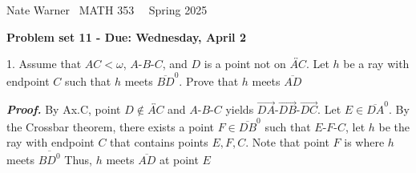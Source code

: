 \documentclass{report}
\title{\Huge{}}
\author{\huge{Nathan Warner}}
\date{\huge{}}
\begin{document}
    \pagebreak \bigbreak \noindent
    Nate Warner \ \quad \quad \quad \quad \quad \quad \quad \quad \quad \quad \quad \quad  MATH 353 \quad  \quad \quad \quad \quad \quad \quad \quad \quad \ \ \quad \quad Spring 2025
    \begin{center}
        \textbf{Problem set 11 - Due: Wednesday, April 2}
    \end{center}
    \bigbreak \noindent 
    \begin{mdframed}
        1. Assume that $AC < \omega$, $ A\text{-}B\text{-}C$, and $D$ is a point not on $\overleftrightarrow{AC}$. Let $h$ be a ray with endpoint $C$ such that $h$ meets $\overline{BD}^{0} $. Prove that $h$ meets $\overline{AD} $
    \end{mdframed}
    \bigbreak \noindent 
    \textbf{\textit{Proof.}} By Ax.C, point $D\not\in \overleftrightarrow{AC}$  and $ A\text{-}B\text{-}C$ yields $ \overrightarrow{DA}\text{-}\overrightarrow{DB}\text{-}\overrightarrow{DC}$. Let $E \in \overline{DA}^{0}$. By the Crossbar theorem, there exists a point $F \in \overline{DB}^{0}$ such that $ E\text{-}F\text{-}C$, let $h$ be the ray with endpoint $C$ that contains points $E,F,C$. Note that point $F$ is where $h$ meets $ \overline{BD^{0}} $
    \bigbreak \noindent 
    Thus, $ h$ meets $\overline{AD}$ at point $E$ \endpf
\end{document}
